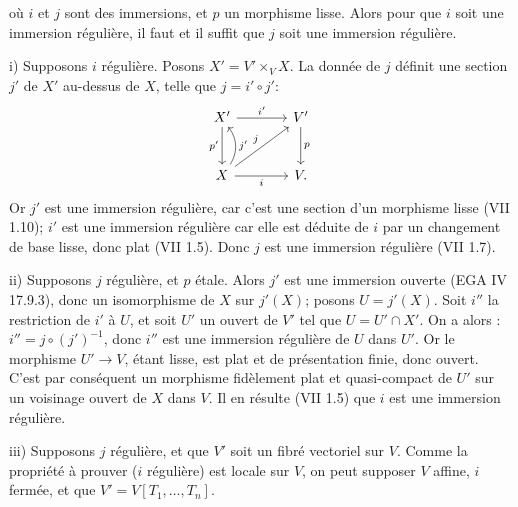 où $i$ et $j$
sont des immersions, et $p$ un morphisme lisse. Alors pour que $i$ soit une immersion régulière, il faut et il suffit que $j$ soit une immersion régulière.

i) Supposons $i$ régulière. Posons $X'=V'\times_V X$. La donnée de $j$ définit une section $j'$ de $X'$ au-dessus de $X$, telle que $j=i'\circ j'$:
\[
\begin{tikzcd}[column sep=large,row sep=large]
X' \arrow[r,"i'"] \arrow[d,"p'"'] & V' \arrow[d,"p"]\\
X \arrow[r,"i"'] \arrow[ur,"j"] \arrow[u,bend right=35,"j'"'] & V .
\end{tikzcd}
\]
Or $j'$ est une immersion régulière, car c'est une section d'un morphisme lisse (VII 1.10); $i'$ est une immersion régulière car elle est déduite de $i$ par un changement de base lisse, donc plat (VII 1.5). Donc $j$ est une immersion régulière (VII 1.7).

ii) Supposons $j$ régulière, et $p$ étale. Alors $j'$ est une immersion ouverte (EGA IV 17.9.3), donc un isomorphisme de $X$ sur $j'(X)$; posons $U=j'(X)$. Soit $i''$ la restriction de $i'$ à $U$, et soit $U'$ un ouvert de $V'$ tel que $U=U'\cap X'$. On a alors : $i''=j\circ(j')^{-1}$, donc $i''$ est une immersion régulière de $U$ dans $U'$. Or le morphisme $U'\to V$, étant lisse, est plat et de présentation finie, donc ouvert. C'est par conséquent un morphisme fidèlement plat et quasi-compact de $U'$ sur un voisinage ouvert de $X$ dans $V$. Il en résulte (VII 1.5) que $i$ est une immersion régulière.

iii) Supposons $j$ régulière, et que $V'$ soit un fibré vectoriel sur $V$. Comme la propriété à prouver ($i$ régulière) est locale sur $V$, on peut supposer $V$ affine, $i$ fermée, et que $V'=V[T_1,\ldots,T_n]$.
